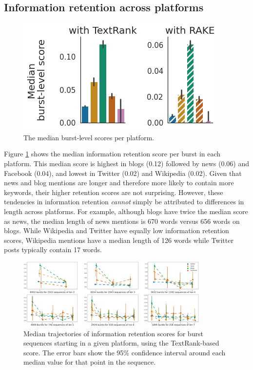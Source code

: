 \documentclass[letterpaper]{article} %
\begin{document}
\subsection{Information retention across platforms}

\begin{figure}[t]
    \centering
    \includegraphics[width=0.9\columnwidth]{figs/median_scores_platforms.png}
    \caption{The median burst-level scores per platform.}
    \label{fig:burst_medianscore_platform}
\end{figure}

Figure \ref{fig:burst_medianscore_platform} shows the median information retention score per burst in each platform. This median score is highest in blogs (0.12) followed by news (0.06) and Facebook (0.04), and lowest in Twitter (0.02) and Wikipedia (0.02). Given that news and blog mentions are longer and therefore more likely to contain more keywords, their higher retention scores are not surprising. However, these tendencies in information retention \emph{cannot} simply be attributed to differences in length across platforms. For example, although blogs have twice the median score as news, the median length of news mentions is 670 words versus 656 words on blogs. While Wikipedia and Twitter have equally low information retention scores, Wikipedia mentions have a median length of 126 words while Twitter posts typically contain 17 words.

\begin{figure}[t]
    \centering
    \includegraphics[width=0.85\textwidth]{figs/trajectory_platform.png}
    \caption{Median trajectories of information retention scores for burst sequences starting in a given platform, using the TextRank-based score. The error bars show the 95\% confidence interval around each median value for that point in the sequence.}
    \label{fig:sequences2_9_first}
\end{figure}
\end{document}
